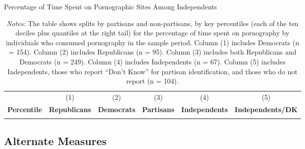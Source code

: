 \documentclass[12pt, letterpaper]{article}
\begin{document}
\begin{table}[ht] \centering \small \setlength\tabcolsep{6 pt}
	\caption{Percentage of Time Spent on Pornographic Sites Among Independents}
	\label{tab:percentiles_prop_duration_adultsites_by_individuals_independents_partisans}
	\begin{adjustbox}{max width=\textwidth}
		\begin{tabular}{@{\hspace{0\tabcolsep}}crrrrr@{\hspace{0\tabcolsep}}}
			\toprule		
			&\multicolumn{1}{c}{(1)}&\multicolumn{1}{c}{(2)}&\multicolumn{1}{c}{(3)}&\multicolumn{1}{c}{(4)}&\multicolumn{1}{c}{(5)}\\	
			\multicolumn{1}{l}{\textbf{Percentile}}&\multicolumn{1}{c}{\textbf{Republicans}}&\multicolumn{1}{c}{\textbf{Democrats}}&\multicolumn{1}{c}{\textbf{Partisans}}&\multicolumn{1}{c}{\textbf{Independents}}&\multicolumn{1}{r}{\textbf{Independents/DK}}\\
			\midrule
			\\
			\bottomrule
		\end{tabular}
	\end{adjustbox}
	\caption*{\footnotesize \emph{Notes:} 
		The table shows splits by partisans and non-partisans, by key percentiles (each of the ten deciles plus quantiles at the right tail) for the percentage of time spent on pornography by individuals who consumed pornography in the sample period. 
		Column (1) includes Democrats (n = 154).
		Column (2) includes Republicans (n = 95).
		Column (3) includes both Republicans and Democrats (n = 249).
		Column (4) includes Independents (n = 67).
		Column (5) includes Independents, those who report ``Don't Know'' for partisan identification, and those who do not report (n = 104).
	}
\end{table}

\cleardoublepage
\FloatBarrier
\subsection{Alternate Measures}
\end{document}

